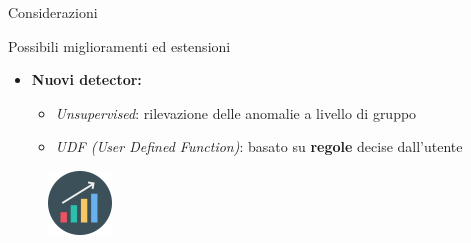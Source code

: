 \documentclass{beamer}
\begin{document}
	\begin{frame}{Considerazioni}
		\begin{block}{Possibili miglioramenti ed estensioni}
			\begin{itemize}
				\item \textbf{Nuovi detector:} 
					\begin{itemize}
						\item \textit{Unsupervised}: rilevazione delle anomalie a livello di gruppo \vspace{.5em}
						\item \textit{UDF (User Defined Function)}: basato su \textbf{regole} decise dall'utente \vspace{.5em}
					\end{itemize}
			\end{itemize}
		\end{block}
		
		\begin{figure}[!h]
    		 \centering
    		\includegraphics[width=1.7cm]{../immagini/slide/increasing-bar-graph.png}
		\end{figure}
		\vspace{0.3cm}
		\hspace{6cm}
	\end{frame}
	

\end{document}
